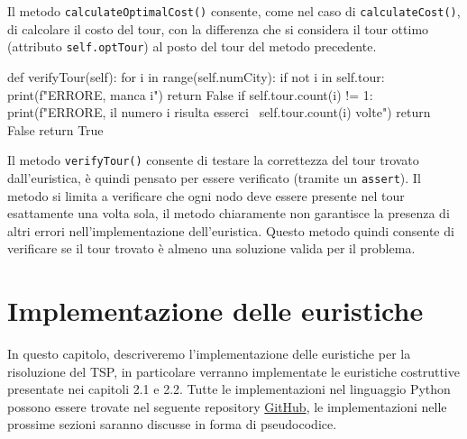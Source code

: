 \documentclass[a4paper,12pt]{report}
\begin{document}
Il metodo \lstinline!calculateOptimalCost()! consente, come nel caso di \lstinline!calculateCost()!, di calcolare il costo del tour, con la differenza che si considera il tour ottimo (attributo \lstinline!self.optTour!) al posto del tour del metodo precedente.
\begin{python}
def verifyTour(self):
  for i in range(self.numCity):
    if not i in self.tour:
      print(f"ERRORE, manca {i}")
      return False
    if self.tour.count(i) != 1:
      print(f"ERRORE, il numero {i} risulta esserci \
             {self.tour.count(i)} volte")
      return False
  return True
\end{python}
Il metodo \lstinline!verifyTour()! consente di testare la correttezza del tour trovato dall'euristica, è quindi pensato per essere verificato (tramite un \lstinline!assert!). Il metodo si limita a verificare che ogni nodo deve essere presente nel tour esattamente una volta sola, il metodo chiaramente non garantisce la presenza di altri errori nell'implementazione dell'euristica. Questo metodo quindi consente di verificare se il tour trovato è almeno una soluzione valida per il problema.

\section{Implementazione delle euristiche}
In questo capitolo, descriveremo l'implementazione delle euristiche per la risoluzione del TSP, in particolare verranno implementate le euristiche costruttive presentate nei capitoli 2.1 e 2.2. Tutte le implementazioni nel linguaggio Python possono essere trovate nel seguente repository \href{https://github.com/cohenasaf/Furthest-insertion}{GitHub}, le implementazioni nelle prossime sezioni saranno discusse in forma di pseudocodice.
\end{document}
